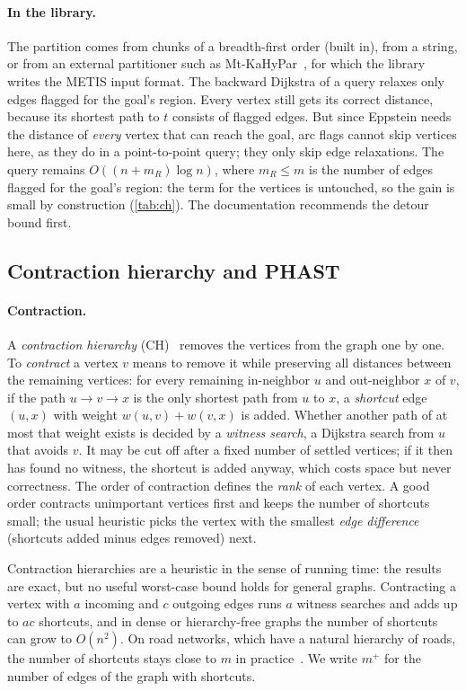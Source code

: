 \documentclass[11pt,a4paper]{article}
\begin{document}
\paragraph{In the library.} The partition comes from chunks of a breadth-first order (built in), from a string, or
from an external partitioner such as Mt-KaHyPar~\cite{mtkahypar}, for which the library writes the METIS input
format. The backward Dijkstra of a query relaxes only edges flagged for the goal's region. Every vertex still gets
its correct distance, because its shortest path to $t$ consists of flagged edges. But since Eppstein needs the
distance of \emph{every} vertex that can reach the goal, arc flags cannot skip vertices here, as they do in a
point-to-point query; they only skip edge relaxations. The query remains $O((n+m_R)\log n)$, where $m_R\le m$ is
the number of edges flagged for the goal's region: the term for the vertices is untouched, so the gain is small by
construction (\cref{tab:ch}). The
documentation recommends the detour bound first.

\subsection{Contraction hierarchy and PHAST}\label{sec:ch}

\paragraph{Contraction.} A \emph{contraction hierarchy} (CH)~\cite{geisberger2008} removes the vertices from the graph
one by one. To \emph{contract} a vertex $v$ means to remove it while preserving all distances between the remaining
vertices: for every remaining in-neighbor $u$ and out-neighbor $x$ of $v$, if the path $u\to v\to x$ is the only
shortest path from $u$ to $x$, a \emph{shortcut} edge $(u,x)$ with weight $w(u,v)+w(v,x)$ is added. Whether another
path of at most that weight exists is decided by a \emph{witness search}, a Dijkstra search from $u$ that avoids
$v$. It may be cut off after a fixed number of settled vertices; if it then has found no witness, the shortcut is
added anyway, which costs space but never correctness. The order of contraction defines the \emph{rank} of each
vertex. A good order contracts unimportant vertices first and keeps the number of shortcuts small; the usual
heuristic picks the vertex with the smallest \emph{edge difference} (shortcuts added minus edges removed) next.

Contraction hierarchies are a heuristic in the sense of running time: the results are exact, but no useful
worst-case bound holds for general graphs. Contracting a vertex with $a$ incoming and $c$ outgoing edges runs $a$
witness searches and adds up to $ac$ shortcuts, and in dense or hierarchy-free graphs the number of shortcuts can
grow to $O(n^2)$. On road networks, which have a natural hierarchy of roads, the number of shortcuts stays close
to $m$ in practice~\cite{geisberger2008}. We write $m^+$ for the number of edges of the graph with shortcuts.
\end{document}
